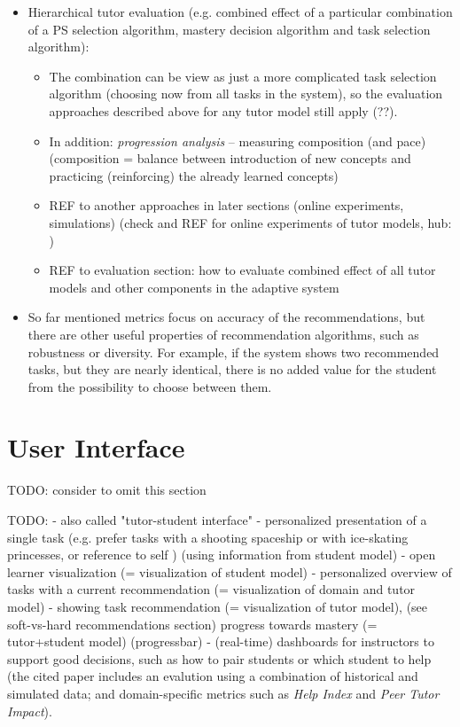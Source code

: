 \begin{itemize}
\item Hierarchical tutor evaluation (e.g. combined effect of a particular combination
  of a PS selection algorithm, mastery decision algorithm and task selection algorithm):
\begin{itemize}
\item The combination can be view as just a more complicated task selection algorithm
  (choosing now from all tasks in the system), so the evaluation approaches described
  above for any tutor model still apply (??).
\item In addition: \emph{progression analysis} -- measuring composition (and pace)
  (composition = balance between introduction of new concepts and practicing (reinforcing) the already learned concepts) \cite{progression-analysis}
\item REF to another approaches in later sections (online experiments, simulations)
  (check and REF for online experiments of tutor models,
  hub: \cite[p.2/138]{rl-for-tutors-evaluation})
\item REF to evaluation section: how to evaluate combined effect of all tutor
  models and other components in the adaptive system
\end{itemize}

\item %
So far mentioned metrics focus on accuracy of the recommendations,
but there are other useful properties of recommendation algorithms,
such as robustness or diversity.
For example, if the system shows two recommended tasks,
but they are nearly identical, there is no added value
for the student from the possibility to choose between them.
\end{itemize}



\section{User Interface}
\label{sec:user-interface}

TODO: consider to omit this section

TODO:
- also called "tutor-student interface"
- personalized presentation of a single task
(e.g. prefer tasks with a shooting spaceship or with ice-skating princesses,
or reference to self \cite[chapter 9]{its-domain-models})
(using information from student model)
- open learner visualization (= visualization of student model)
- personalized overview of tasks with a current recommendation (= visualization
of domain and tutor model)
- showing task recommendation (= visualization of tutor model),
  (see soft-vs-hard recommendations section)
  progress towards mastery (= tutor+student model)
  (progressbar)
- (real-time) dashboards for instructors to support good decisions,
  such as how to pair students or which student to help \cite{instructor-dashboard-realtime}
  (the cited paper includes an evalution using a combination of historical and simulated data;
  and domain-specific metrics such as \emph{Help Index} and \emph{Peer Tutor Impact}).

